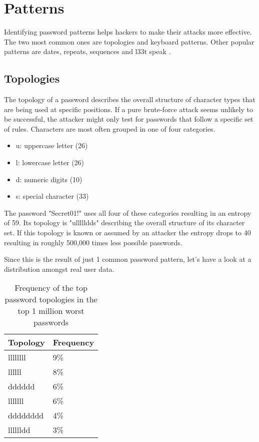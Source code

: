 \section{Patterns}

Identifying password patterns helps hackers to make their attacks more effective. The two most common ones are topologies and keyboard patterns. Other popular patterns are dates, repeats, sequences and l33t speak \cite{zxcvbn}.

\subsection{Topologies}

The topology of a password describes the overall structure of character types that are being used at specific positions. If a pure brute-force attack seems unlikely to be successful, the attacker might only test for passwords that follow a specific set of rules. Characters are most often grouped in one of four categories.

\begin{itemize}
\item u: uppercase letter (26)
\item l: lowercase letter (26)
\item d: numeric digits (10)
\item s: special character (33)
\end{itemize}

The password "Secret01!" uses all four of these categories resulting in an entropy of 59. Its topology is "ullllldds" describing the overall structure of its character set. If this topology is known or assumed by an attacker the entropy drops to 40 resulting in roughly 500,000 times less possible passwords.

Since this is the result of just 1 common password pattern, let's have a look at a distribution amongst real user data.

\begin{table}[h!]
\centering
\begin{tabular}{l l}
	Topology	& Frequency \\
	\hline
	llllllll	& 9\% \\
	llllll		& 8\% \\
	dddddd		& 6\% \\
	lllllll		& 6\% \\
	dddddddd	& 4\% \\
	lllllldd	& 3\%
\end{tabular}
\caption{Frequency of the top password topologies in the top 1 million worst passwords}
\cite{seclist}
\end{table}

